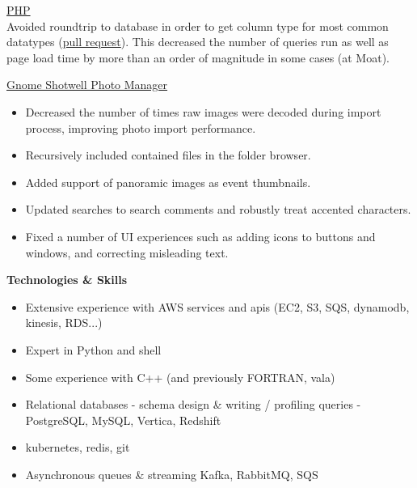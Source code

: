 \myfontsize{\littleheader}
\href{https://github.com/php/php-src}{PHP}\\
\myfontsize{\bodysize}
Avoided roundtrip to database in order to get column type for most common datatypes (\href{https://github.com/php/php-src/pull/1534}{pull request}).
This decreased the number of queries run as well as page load time by more than an order of magnitude in some cases (at Moat).

\vspace{\littleskip}
\vspace{\littleskip}

\myfontsize{\littleheader}
\href{https://gitlab.gnome.org/GNOME/shotwell}{Gnome Shotwell Photo Manager}\\
\myfontsize{\bodysize}
\begin{itemize}[topsep=1ex, partopsep=0ex, parsep=0ex, itemsep=0.4ex]
    \item Decreased the number of times raw images were decoded during import process, improving photo import performance.
    \item Recursively included contained files in the folder browser.
    \item Added support of panoramic images as event thumbnails.
    \item Updated searches to search comments and robustly treat accented characters.
    \item Fixed a number of UI experiences such as adding icons to buttons and windows, and correcting misleading text.
\end{itemize}


\vspace{\mybigskip}
\myfontsize{\littleheader}
\textbf{Technologies \& Skills}\\
\myfontsize{\bodysize}
\begin{itemize}[topsep=1ex, partopsep=0ex, parsep=0ex, itemsep=0.4ex]
    \item Extensive experience with AWS services and apis (EC2, S3, SQS, dynamodb, kinesis, RDS...)
    \item Expert in Python and shell
    \item Some experience with C++ (and previously FORTRAN, vala)
    \item Relational databases - schema design \& writing / profiling queries - PostgreSQL, MySQL, Vertica, Redshift
    \item kubernetes, redis, git
    \item Asynchronous queues \& streaming Kafka, RabbitMQ, SQS
\end{itemize}


\iffalse

\fi

